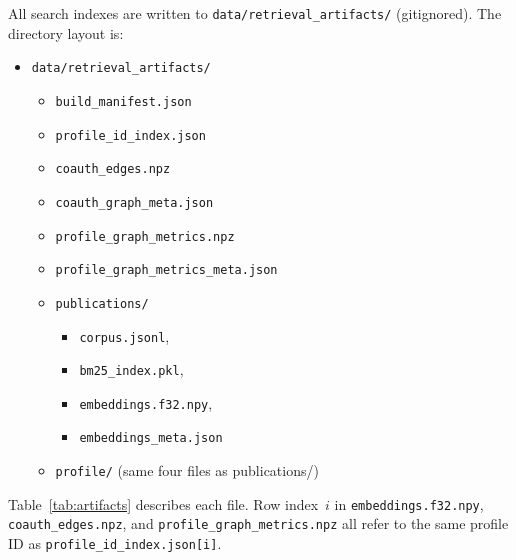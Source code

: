 \documentclass{article}
\begin{document}
All search indexes are written to \texttt{data/retrieval\_artifacts/} (gitignored). The directory layout is:
\begin{itemize}
\item \texttt{data/retrieval\_artifacts/}
\begin{itemize}
  \item \texttt{build\_manifest.json}
  \item \texttt{profile\_id\_index.json}
  \item \texttt{coauth\_edges.npz}
  \item \texttt{coauth\_graph\_meta.json}
  \item \texttt{profile\_graph\_metrics.npz}
  \item \texttt{profile\_graph\_metrics\_meta.json}
  \item \texttt{publications/}
  
\begin{itemize}
    \item \texttt{corpus.jsonl}, 
    \item \texttt{bm25\_index.pkl}, 
    \item \texttt{embeddings.f32.npy}, 
    \item \texttt{embeddings\_meta.json}
\end{itemize}
  \item \texttt{profile/} (same four files as publications/)
  
\end{itemize}
\end{itemize}

Table~\ref{tab:artifacts} describes each file. Row index~$i$ in \texttt{embeddings.f32.npy}, \texttt{coauth\_edges.npz}, and \texttt{profile\_graph\_metrics.npz} all refer to the same profile ID as \texttt{profile\_id\_index.json[i]}.
\end{document}
